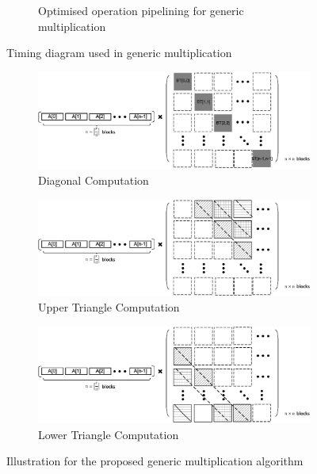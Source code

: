 \documentclass[runningheads]{llncs}
\begin{document}
\begin{figure}[!tb]
\begin{subfigure}[t]{0.47\textwidth}
\caption{Optimised operation pipelining for generic multiplication }
\label{fig:pipeline_gmul2}
\end{subfigure}
\caption{Timing diagram used in generic multiplication}
\end{figure}


\begin{figure}[!tb]
\centering
\begin{subfigure}[t]{0.47\textwidth}\centering
\includegraphics[width=\textwidth]{./fig/generic_mul_illustrate.eps}
\caption{Diagonal Computation}
\label{fig:gmul_ill1}
\end{subfigure}
\hspace{1em}
\begin{subfigure}[t]{0.47\textwidth}\centering
\includegraphics[width=\textwidth]{./fig/generic_mul_illustrate2.eps}
\caption{Upper Triangle Computation}
\label{fig:gmul_ill2}
\end{subfigure}
\hspace{1em}
\begin{subfigure}[t]{0.47\textwidth}\centering
\includegraphics[width=\textwidth]{./fig/generic_mul_illustrate3.eps}
\caption{Lower Triangle Computation}
\label{fig:gmul_ill3}
\end{subfigure}
\caption{Illustration for the proposed generic multiplication algorithm}
\end{figure}
\end{document}
